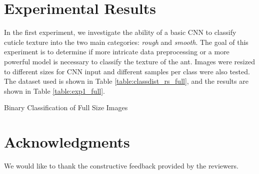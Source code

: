 \documentclass{aci}
\begin{document}
\section{Experimental Results}

In the first experiment, we investigate the ability of a basic CNN to classify
cuticle texture into the two main categories: \textit{rough} and
\textit{smooth}. The goal of this experiment is to determine if more intricate
data preprocessing or a more powerful model is necessary to classify the texture
of the ant. Images were resized to different sizes for CNN input and different
samples per class were also tested. The dataset used is shown in Table
\ref{table:classdist_rs_full}, and the results are shown in Table
\ref{table:exp1_full}.

\begin{table}[h]
  \centering
  \caption{Binary Classification of Full Size Images}
  \label{table:exp1_full}
  
\end{table}

\section*{Acknowledgments}
We would like to thank the constructive feedback provided by the reviewers.



\end{document}
